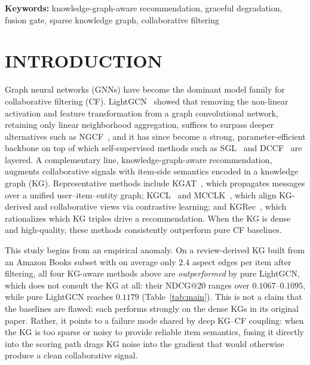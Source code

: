 \documentclass[12pt,a4paper]{article}
\begin{document}
\vspace{0.3em}
{\noindent\bfseries Keywords:} knowledge-graph-aware recommendation, graceful degradation, fusion gate, sparse knowledge graph, collaborative filtering

\section{INTRODUCTION}
\label{sec:intro}

Graph neural networks (GNNs) have become the dominant model family for collaborative filtering (CF). LightGCN~\cite{he2020lightgcn} showed that removing the non-linear activation and feature transformation from a graph convolutional network, retaining only linear neighborhood aggregation, suffices to surpass deeper alternatives such as NGCF~\cite{wang2019ngcf}, and it has since become a strong, parameter-efficient backbone on top of which self-supervised methods such as SGL~\cite{wu2021sgl} and DCCF~\cite{ren2023dccf} are layered. A complementary line, knowledge-graph-aware recommendation, augments collaborative signals with item-side semantics encoded in a knowledge graph (KG). Representative methods include KGAT~\cite{wang2019kgat}, which propagates messages over a unified user--item--entity graph; KGCL~\cite{yang2022kgcl} and MCCLK~\cite{zou2022mcclk}, which align KG-derived and collaborative views via contrastive learning; and KGRec~\cite{yang2023kgrec}, which rationalizes which KG triples drive a recommendation. When the KG is dense and high-quality, these methods consistently outperform pure CF baselines.

This study begins from an empirical anomaly. On a review-derived KG built from an Amazon Books subset with on average only $2.4$ aspect edges per item after filtering, all four KG-aware methods above are \emph{outperformed} by pure LightGCN, which does not consult the KG at all: their NDCG@20 ranges over $0.1067$--$0.1095$, while pure LightGCN reaches $0.1179$ (Table~\ref{tab:main}). This is not a claim that the baselines are flawed: each performs strongly on the dense KGs in its original paper. Rather, it points to a failure mode shared by deep KG--CF coupling: when the KG is too sparse or noisy to provide reliable item semantics, fusing it directly into the scoring path drags KG noise into the gradient that would otherwise produce a clean collaborative signal.
\end{document}
